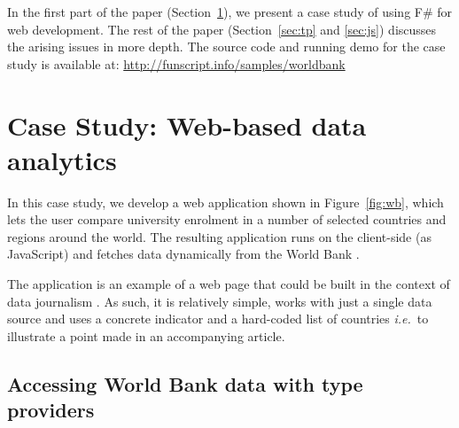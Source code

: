 \documentclass[submission,copyright,creativecommons]{eptcs}
\begin{document}
\noindent
In the first part of the paper (Section~\ref{sec:case}), we present a case study of using 
F\# for web development. The rest of the paper (Section~\ref{sec:tp} and \ref{sec:js}) discusses 
the arising issues in more depth. The source code and running demo for the case study is available 
at: \url{http://funscript.info/samples/worldbank}


\section{Case Study: Web-based data analytics}
\label{sec:case}
In this case study, we develop a web application shown in Figure~\ref{fig:wb}, which lets the
user compare university enrolment in a number of selected countries and regions around the world. 
The resulting application runs on the client-side (as JavaScript) and fetches data dynamically 
from the World Bank \cite{data-wb-schter}.

The application is an example of a web page that could be built in the context of data journalism 
\cite{dj-handbook}. As such, it is relatively simple, works with just a single data source and 
uses a concrete indicator and a hard-coded list of countries \emph{i.e.}~to illustrate a point 
made in an accompanying article.


\subsection{Accessing World Bank data with type providers}
\end{document}
